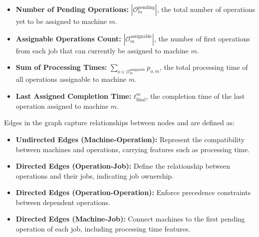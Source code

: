 \begin{itemize}
    \item \textbf{Number of Pending Operations:} $|\mathcal{O}_m^{\text{pending}}|$, the total number of operations yet to be assigned to machine $m$.
    \item \textbf{Assignable Operations Count:} $|\mathcal{O}_m^{\text{assignable}}|$, the number of first operations from each job that can currently be assigned to machine $m$.
    \item \textbf{Sum of Processing Times:} $\sum_{o \in \mathcal{O}_m^{\text{assignable}}} p_{o,m}$, the total processing time of all operations assignable to machine $m$.
    \item \textbf{Last Assigned Completion Time:} $t_{\text{final}}^m$, the completion time of the last operation assigned to machine $m$.
\end{itemize}

Edges in the graph capture relationships between nodes and are defined as:

\begin{itemize}
    \item \textbf{Undirected Edges (Machine-Operation):} Represent the compatibility between machines and operations, carrying features such as processing time.
    \item \textbf{Directed Edges (Operation-Job):} Define the relationship between operations and their jobs, indicating job ownership.
    \item \textbf{Directed Edges (Operation-Operation):} Enforce precedence constraints between dependent operations.
    \item \textbf{Directed Edges (Machine-Job):} Connect machines to the first pending operation of each job, including processing time features.
\end{itemize}

